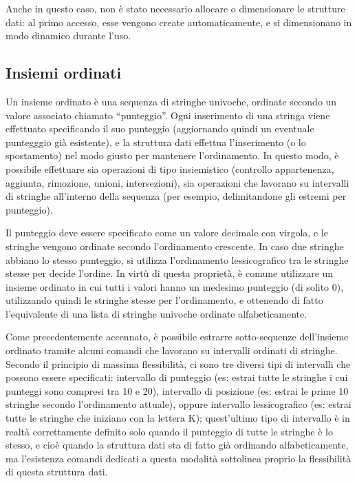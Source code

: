 Anche in questo caso, non è stato necessario allocare o dimensionare le strutture dati: al primo
accesso, esse vengono create automaticamente, e si dimensionano in modo dinamico durante l'uso.

\subsection{Insiemi ordinati}

Un insieme ordinato è una sequenza di stringhe univoche, ordinate secondo un valore associato
chiamato ``punteggio''. Ogni inserimento di una stringa viene effettuato specificando il suo
punteggio (aggiornando quindi un eventuale puntegggio già esistente), e la struttura dati effettua
l'inserimento (o lo spostamento) nel modo giusto per mantenere l'ordinamento. In questo modo, è
possibile effettuare sia operazioni di tipo insiemistico (controllo appartenenza, aggiunta,
rimozione, unioni, intersezioni), sia operazioni che lavorano su intervalli di stringhe all'interno
della sequenza (per esempio, delimitandone gli estremi per punteggio).

Il punteggio deve essere specificato come un valore decimale con virgola, e le stringhe vengono
ordinate secondo l'ordinamento crescente. In caso due stringhe abbiano lo stesso punteggio, si
utilizza l'ordinamento lessicografico tra le stringhe stesse per decide l'ordine. In virtù di
questa proprietà, è comune utilizzare un insieme ordinato in cui tutti i valori hanno un medesimo
punteggio (di solito 0), utilizzando quindi le stringhe stesse per l'ordinamento, e ottenendo di
fatto l'equivalente di una lista di stringhe univoche ordinate alfabeticamente.

Come precedentemente accennato, è possibile estrarre sotto-sequenze dell'insieme ordinato tramite
alcuni comandi che lavorano su intervalli ordinati di stringhe. Secondo il principio di massima
flessibilità, ci sono tre diversi tipi di intervalli che possono essere specificati: intervallo di
punteggio (es: estrai tutte le stringhe i cui punteggi sono compresi tra 10 e 20), intervallo di
posizione (es: estrai le prime 10 stringhe secondo l'ordinamento attuale), oppure intervallo
lessicografico (es: estrai tutte le stringhe che iniziano con la lettera K); quest'ultimo tipo di
intervallo è in realtà correttamente definito solo quando il punteggio di tutte le stringhe è lo
stesso, e cioè quando la struttura dati sta di fatto già ordinando alfabeticamente, ma l'esistenza
comandi dedicati a questa modalità sottolinea proprio la flessibilità di questa struttura dati.

